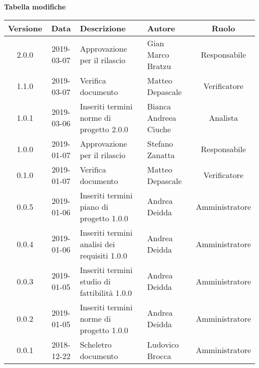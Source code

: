 \begin{center}
	\textbf{Tabella modifiche}
	\end{center}
	\begin{center}
		\begin{tabularx}{\textwidth}{|c|c|X|X|c|}
			\hline
			\textbf{Versione} & \textbf{Data} & \textbf{Descrizione} & \textbf{Autore} & \textbf{Ruolo} \\
			\hline
			2.0.0 & 2019-03-07 & Approvazione per il rilascio & Gian Marco Bratzu & Responsabile \\
			\hline
			1.1.0 & 2019-03-07 & Verifica documento & Matteo Depascale & Verificatore \\
			\hline
			1.0.1 & 2019-03-06 & Inseriti termini norme di progetto 2.0.0 & Bianca Andreea Ciuche & Analista \\
			\hline
			1.0.0 & 2019-01-07 & Approvazione per il rilascio & Stefano Zanatta & Responsabile \\
			\hline
			0.1.0 & 2019-01-07 & Verifica documento & Matteo Depascale & Verificatore \\
			\hline
			0.0.5 & 2019-01-06 & Inseriti termini piano di progetto 1.0.0 & Andrea Deidda & Amministratore\\
			\hline
			0.0.4 & 2019-01-06 & Inseriti termini analisi dei requisiti 1.0.0 & Andrea Deidda & Amministratore\\
			\hline
			0.0.3 & 2019-01-05 & Inseriti termini studio di fattibilità 1.0.0 & Andrea Deidda & Amministratore\\
			\hline
			0.0.2 & 2019-01-05 & Inseriti termini norme di progetto 1.0.0 & Andrea Deidda & Amministratore\\
			\hline
			0.0.1 & 2018-12-22 & Scheletro documento & Ludovico Brocca & Amministratore\\
			\hline
		\end{tabularx}
	\end{center}
\newpage